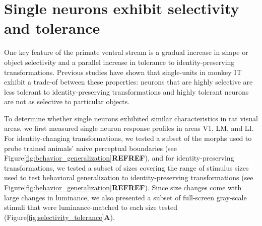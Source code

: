 \section{Single neurons exhibit selectivity and tolerance}
One key feature of the primate ventral stream is a gradual increase in shape or object selectivity and a parallel increase in tolerance to identity-preserving transformations. Previous studies have shown that single-units in monkey IT exhibit a trade-of between these properties: neurons that are highly selective are less tolerant to identity-preserving transformations and highly tolerant neurons are not as selective to particular objects\cite{Zoccolan2007}.

To determine whether single neurons exhibited similar characteristics in rat visual areas, we first measured single neuron response profiles in areas V1, LM, and LI. For identity-changing transformations, we tested a subset of the morphs used to probe trained animals’ naive perceptual boundaries (see Figure\ref{fig:behavior_generalization}\textbf{REFREF}), and for identity-preserving transformations, we tested a subset of sizes covering the range of stimulus sizes used to test behavioral generalization to identity-preserving transformations (see Figure\ref{fig:behavior_generalization}\textbf{REFREF}). Since size changes come with large changes in luminance, we also presented a subset of full-screen gray-scale stimuli that were luminance-matched to each size tested (Figure\ref{fig:selectivity_tolerance}\textbf{A}).

